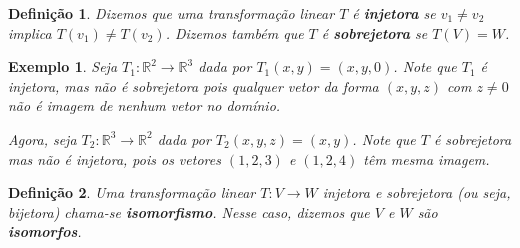 \documentclass{article}
\newtheorem*{definition}{Definição}
\newtheorem*{example}{Exemplo}
\begin{document}
\begin{definition}
	Dizemos que uma transformação linear $T$ é \textbf{injetora} se $v_1\neq v_2 $ implica $T(v_1)\neq T(v_2)$. Dizemos também que $T$ é \textbf{sobrejetora} se $T(V) = W$.
\end{definition} 

\begin{example}
	Seja $T_1:\mathbb{R}^2\to\mathbb{R}^3$ dada por $T_1(x,y) = (x,y,0)$. Note que $T_1$ é injetora, mas não é sobrejetora pois qualquer vetor da forma $(x,y,z)$ com $z\neq0$ não é imagem de nenhum vetor no domínio.
	\par\vspace{0.3cm}\hspace{16pt} Agora, seja $T_2:\mathbb{R}^3\to\mathbb{R}^2$ dada por $T_2(x,y,z) = (x,y)$. Note que $T$ é sobrejetora mas não é injetora, pois os vetores $(1,2,3)$ e $(1,2,4)$ têm mesma imagem.
\end{example}

\begin{definition}
	Uma transformação linear $T:V\to W$ injetora e sobrejetora (ou seja, bijetora) chama-se \textbf{isomorfismo}. Nesse caso, dizemos que $V$ e $W$ são \textbf{isomorfos}.
\end{definition}
\end{document}
